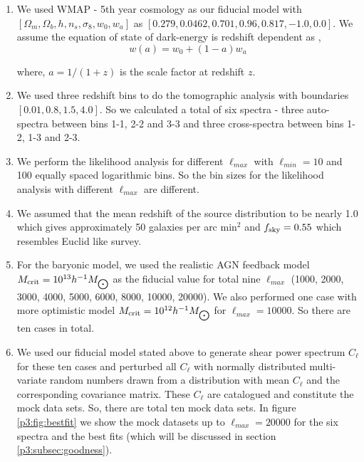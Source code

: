 \documentclass[
  11pt,
  twoside,
  openright,
  titlepage,
  headings=optiontoheadandtoc
]{scrbook}
\begin{document}
\begin{enumerate}

\item We used WMAP - 5th year cosmology  as our fiducial model with
$[\Omega_m,\allowbreak \Omega_b,\allowbreak h,\allowbreak n_s,\allowbreak
\sigma_8,\allowbreak w_0,\allowbreak w_a]$ as
$[0.279,\allowbreak 0.0462,\allowbreak 0.701,\allowbreak 0.96,\allowbreak
0.817,\allowbreak -1.0,\allowbreak 0.0]$. We assume the equation of state of dark-energy is redshift dependent as \citep{2001IJMPD..10..213C,2003PhRvL..90i1301L},
\begin{equation}
	w(a) = w_0 + (1-a)w_a
\end{equation}

where, $a = 1/(1+z)$ is the scale factor at redshift $z$.

\item We used three redshift bins to do the tomographic analysis with boundaries $[0.01, 0.8, 1.5, 4.0]$. So we calculated a total of six spectra - three auto-spectra between bins 1-1, 2-2 and 3-3 and three cross-spectra between bins 1-2, 1-3 and 2-3. 

\item We perform the likelihood analysis for different $\ell_{max}$ with $\ell_{min}=10$ and 100 equally spaced logarithmic bins. So the bin sizes for the likelihood analysis with different $\ell_{max}$ are different.

\item We assumed that the mean redshift of the source distribution to be nearly 1.0 which gives approximately 50 galaxies per arc min$^2$ and $f_{\rm sky}=0.55$ which resembles Euclid like survey.

\item For the baryonic model, we used the realistic AGN feedback model $M_{\rm crit}= 10^{13} h^{-1}M_{\bigodot}$ as the fiducial value for total nine $\ell_{max}$ (1000, 2000, 3000, 4000, 5000, 6000, 8000, 10000, 20000). We also performed one case with more optimistic model $M_{\rm crit} = 10^{12} h^{-1}M_{\bigodot}$ for $\ell_{max}=10000$. So there are ten cases in total. 

\item We used our fiducial model stated above to generate shear power spectrum $C_{\ell}$ for these ten cases and perturbed all $C_{\ell}$ with normally distributed multi-variate random numbers drawn from a distribution with mean $C_{\ell}$ and the corresponding covariance matrix. These $C_{\ell}$ are catalogued and constitute the mock data sets. So, there are total ten mock data sets. In figure \ref{p3:fig:bestfit} we show the mock datasets up to $\ell_{max}=20000$ for the six spectra and the best fits (which will be discussed in section \ref{p3:subsec:goodness}).

\end{enumerate}
\end{document}
